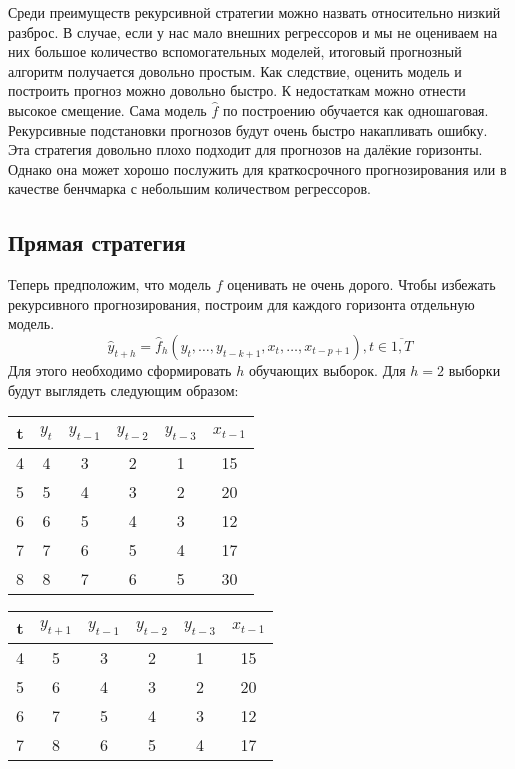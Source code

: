 \documentclass[12pt,fleqn]{article}
\begin{document}
Среди преимуществ рекурсивной стратегии можно назвать относительно низкий разброс. В случае, если у нас мало внешних регрессоров и мы не оцениваем на них большое количество вспомогательных моделей, итоговый прогнозный алгоритм получается довольно простым. Как следствие, оценить модель и построить прогноз можно довольно быстро. К недостаткам можно отнести высокое смещение. Сама модель $\hat{f}$ по построению обучается как одношаговая. Рекурсивные подстановки прогнозов будут очень быстро накапливать ошибку. Эта стратегия довольно плохо подходит для прогнозов на далёкие горизонты. Однако она может хорошо послужить для краткосрочного прогнозирования или в качестве бенчмарка с небольшим количеством регрессоров.

\newpage
\subsection{Прямая стратегия}

Теперь предположим, что модель $f$ оценивать не очень дорого. Чтобы избежать рекурсивного прогнозирования, построим для каждого горизонта отдельную модель. 
$$
\hat{y}_{t+h} = \hat{f}_h(y_t, \ldots, y_{t-k+1}, x_{t}, \ldots, x_{t-p+1}), t \in \overline{1, T}
$$
Для этого необходимо сформировать $h$ обучающих выборок. Для $h=2$ выборки будут выглядеть следующим образом:

\begin{table}[!h]
	 	\centering
	\begin{tabular}[t]{|c|c|cccc|}
		\hline
		t & $y_t$ & $y_{t-1}$ & $y_{t-2}$ & $y_{t-3}$ & $x_{t-1}$ \\ \hline
		4 & 4              & 3                  & 2         & 1         & 15        \\
		5 & 5              & 4                  & 3         & 2         & 20        \\
		6 & 6              & 5                  & 4         & 3         & 12        \\
		7 & 7              & 6                  & 5         & 4         & 17        \\
		8 & 8              & 7                  & 6         & 5         & 30        \\ \hline
	\end{tabular}
	\quad
		\begin{tabular}[t]{|c|c|cccc|}
			\hline
			t & $y_{t+1}$      & $y_{t-1}$ & $y_{t-2}$ & $y_{t-3}$ & $x_{t-1}$ \\ \hline
			4 & 5                & 3                  & 2         & 1         & 15        \\
			5 & 6                & 4                  & 3         & 2         & 20        \\
			6 & 7                & 5                  & 4         & 3         & 12        \\
			7 & 8                & 6                  & 5         & 4         & 17        \\ \hline
		\end{tabular}
\end{table}
\end{document}
